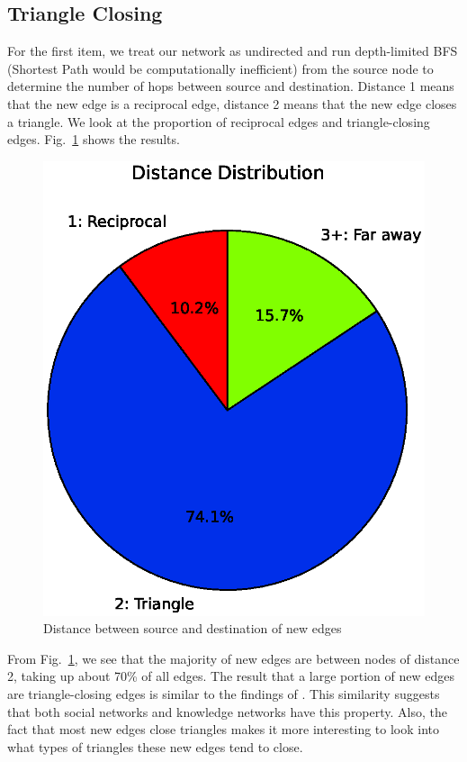 \documentclass[10pt,twocolumn]{article}
\begin{document}
\subsection{Triangle Closing}
For the first item, we treat our network as undirected and run depth-limited BFS (Shortest Path would be computationally inefficient) from the source node to determine the number of hops between source and destination. Distance 1 means that the new edge is a reciprocal edge, distance 2 means that the new edge closes a triangle. We look at the proportion of reciprocal edges and triangle-closing edges. Fig.~\ref{fig:portion123} shows the results.
\begin{figure}[t]
    \centering
    \includegraphics[scale=0.4,trim=0cm 2.2cm 0cm 0cm,clip=true]{./graphs/distance_pie.eps}
    \caption{Distance between source and destination of new edges} \label{fig:portion123}
\end{figure}
From Fig.~\ref{fig:portion123}, we see that the majority of new edges are between nodes of distance 2, taking up about 70\% of all edges. The result that a large portion of new edges are triangle-closing edges is similar to the findings of \cite{leskovec2008microscopic}. This similarity suggests that both social networks and knowledge networks have this property. Also, the fact that most new edges close triangles makes it more interesting to look into what types of triangles these new edges tend to close.
\end{document}
